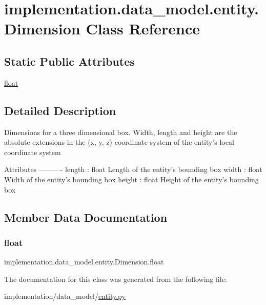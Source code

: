 \hypertarget{classimplementation_1_1data__model_1_1entity_1_1_dimension}{}\section{implementation.\+data\+\_\+model.\+entity.\+Dimension Class Reference}
\label{classimplementation_1_1data__model_1_1entity_1_1_dimension}
\subsection*{Static Public Attributes}
\begin{DoxyCompactItemize}
\item 
\hyperlink{classimplementation_1_1data__model_1_1entity_1_1_dimension_a16deb87502aed4dfd49c48ba374c6052}{float}
\end{DoxyCompactItemize}


\subsection{Detailed Description}
\begin{DoxyVerb}Dimensions for a three dimensional box. Width, length and height are the absolute extensions in the
(x, y, z) coordinate system of the entity's local coordinate system

Attributes
----------
length : float
    Length of the entity's bounding box
width : float
    Width of the entity's bounding box
height : float
    Height of the entity's bounding box
\end{DoxyVerb}
 

\subsection{Member Data Documentation}
\mbox{\label{classimplementation_1_1data__model_1_1entity_1_1_dimension_a16deb87502aed4dfd49c48ba374c6052}} 
\subsubsection{\texorpdfstring{float}{float}}
{\footnotesize\ttfamily implementation.\+data\+\_\+model.\+entity.\+Dimension.\+float\hspace{0.3cm}{\ttfamily [static]}}



The documentation for this class was generated from the following file\+:\begin{DoxyCompactItemize}
\item 
implementation/data\+\_\+model/\hyperlink{entity_8py}{entity.\+py}\end{DoxyCompactItemize}
